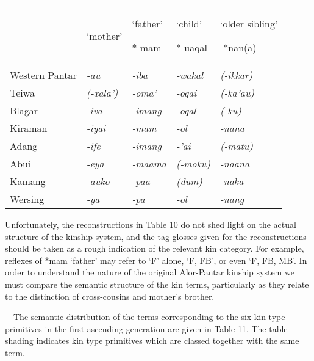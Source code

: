 \begin{center}
\tablehead{}
\begin{supertabular}{m{1.0934598in}m{0.6545598in}m{0.6170598in}m{0.5990598in}m{1.0219599in}}
 &
{\textquoteleft}mother{\textquoteright} &
{\textquoteleft}father{\textquoteright}

*-mam &
{\textquoteleft}child{\textquoteright}

*-uaqal &
{\textquoteleft}older sibling{\textquoteright}

{}-*nan(a)\\
Western Pantar &
\textit{{}-au} &
\textit{{}-iba} &
\textit{{}-wakal} &
\textit{(-ikkar)}\\
Teiwa &
\textit{(-xala{\textquoteright})} &
\textit{{}-oma{\textquoteright}} &
\textit{{}-oqai} &
\textit{(-ka{\textquoteright}au)}\\
Blagar &
\textit{{}-iva} &
\textit{{}-imang} &
\textit{{}-oqal} &
\textit{(-ku)}\\
Kiraman &
\textit{{}-iyai} &
\textit{{}-mam} &
\textit{{}-ol} &
\textit{{}-nana}\\
Adang &
\textit{{}-ife} &
\textit{{}-imang} &
\textit{{}-{\textquoteright}ai} &
\textit{(-matu)}\\
Abui &
\textit{{}-eya} &
\textit{{}-maama} &
\textit{(-moku)} &
\textit{{}-naana}\\
Kamang &
\textit{{}-auko} &
\textit{{}-paa} &
\textit{(dum)} &
\textit{{}-naka}\\
Wersing &
\textit{{}-ya} &
\textit{{}-pa} &
\textit{{}-ol} &
\textit{{}-nang}\\
\end{supertabular}
\end{center}
Unfortunately, the reconstructions in Table 10 do not shed light on the actual structure of the kinship system, and the tag glosses given for the reconstructions should be taken as a rough indication of the relevant kin category. For example, reflexes of *mam {\textquoteleft}father{\textquoteright} may refer to {\textquoteleft}F{\textquoteright} alone, {\textquoteleft}F, FB{\textquoteright}, or even {\textquoteleft}F, FB, MB{\textquoteright}. In order to understand the nature of the original Alor-Pantar kinship system we must compare the semantic structure of the kin terms, particularly as they relate to the distinction of cross-cousins and mother{\textquoteright}s brother.

\ \ The semantic distribution of the terms corresponding to the six kin type primitives in the first ascending generation are given in Table 11. The table shading indicates kin type primitives which are classed together with the same term. 

